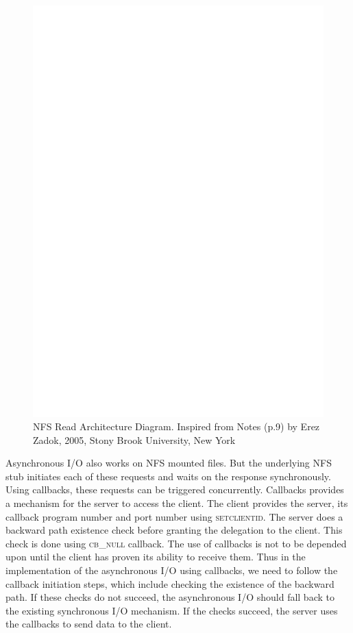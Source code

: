 \begin{figure}
\centering
\includegraphics[scale=0.7]{figures/Read.eps}
\caption{NFS Read Architecture Diagram. Inspired from Notes \cite{NFSv4}(p.9) by Erez Zadok, 2005, Stony Brook University, New York}
\label{fig:NFSReadArch}
\end{figure}


Asynchronous I/O also works on NFS mounted files. But the underlying NFS stub initiates each of these requests and waits on the response synchronously. Using callbacks, these requests can be triggered concurrently. Callbacks provides a mechanism for the server to access the client. The client provides the server, its callback program number and port number using \textsc{setclientid}. The server does a backward path existence check before granting the delegation to the client. This check is done using \textsc{cb\_null} callback. The use of callbacks is not to be depended upon until the client has proven its ability to receive them. Thus in the implementation of the asynchronous I/O using callbacks, we need to follow the callback initiation steps, which include checking the existence of the backward path. If these checks do not succeed, the asynchronous I/O should fall back to the existing synchronous I/O mechanism. If the checks succeed, the server uses the callbacks to send data to the client.

